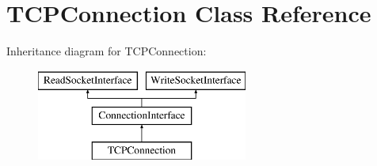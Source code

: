 \hypertarget{class_t_c_p_connection}{}\section{T\+C\+P\+Connection Class Reference}
\label{class_t_c_p_connection}
Inheritance diagram for T\+C\+P\+Connection\+:\begin{figure}[H]
\begin{center}
\leavevmode
\includegraphics[height=3.000000cm]{class_t_c_p_connection}
\end{center}
\end{figure}
